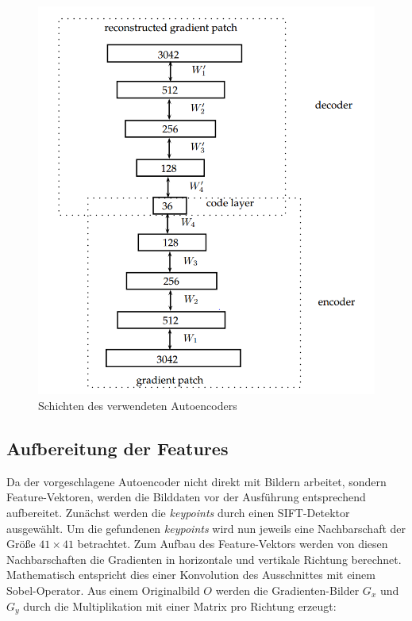 \begin{figure}
	\centering
	\includegraphics[scale=0.6]{images/ae_model.png}
	\caption{Schichten des verwendeten Autoencoders \cite{aed2016}}
	\label{img:ae_model}
\end{figure}

\subsection{Aufbereitung der Features}

Da der vorgeschlagene Autoencoder nicht direkt mit Bildern arbeitet, sondern Feature-Vektoren, werden die Bilddaten vor der Ausführung entsprechend aufbereitet. Zunächst werden die \textit{keypoints} durch einen SIFT-Detektor ausgewählt. Um die gefundenen \textit{keypoints} wird nun jeweils eine Nachbarschaft der Größe $41 \times 41$ betrachtet. Zum Aufbau des Feature-Vektors werden von diesen Nachbarschaften die Gradienten in horizontale und vertikale Richtung berechnet. Mathematisch entspricht dies einer Konvolution des Ausschnittes mit einem Sobel-Operator. Aus einem Originalbild $O$ werden die Gradienten-Bilder $G_{x}$ und $G_{y}$ durch die Multiplikation mit einer Matrix pro Richtung erzeugt:  

